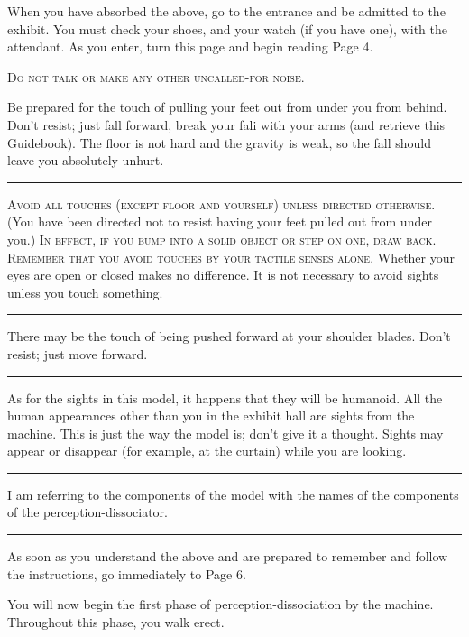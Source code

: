 \documentclass[10pt,twoside,draft]{memoir}
\begin{document}
{{When you have absorbed the above, go to the entrance and be admitted 
to the exhibit. You must check your shoes, and your watch (if you have 
one), with the attendant. As you enter, turn this page and begin reading Page 
4. 

\clearpage

\textsc{Do not talk or make any other uncalled-for noise.}


Be prepared for the touch of pulling your feet out from under you 
from behind. Don't resist; just fall forward, break your fali with your arms 
(and retrieve this Guidebook). The floor is not hard and the gravity is weak, 
so the fall should leave you absolutely unhurt. 

\plainbreak{2}

\textsc{Avoid all touches (except floor and yourself) unless directed otherwise.}
(You have been directed not to resist having your 
feet pulled out from under you.) 
\textsc{In effect, if you bump into a solid object or step on one, draw back. Remember
that you avoid touches by your tactile senses alone.}
Whether your eyes are open or closed makes no difference. It is not necessary to avoid 
sights unless you touch something. 

\plainbreak{2}

There may be the touch of being pushed forward at your shoulder 
blades. Don't resist; just move forward. 

\plainbreak{2}

As for the sights in this model, it happens that they will be humanoid. 
All the human appearances other than you in the exhibit hall are sights from 
the machine. This is just the way the model is; don't give it a thought. Sights 
may appear or disappear (for example, at the curtain) while you are looking. 

\plainbreak{2}

I am referring to the components of the model with the names of the 
components of the perception-dissociator. 

\plainbreak{2}

As soon as you understand the above and are prepared to remember 
and follow the instructions, go immediately to Page 6. 

\clearpage


\clearpage

You will now begin the first phase of perception-dissociation by the 
machine. Throughout this phase, you walk erect. 

}}
\end{document}
